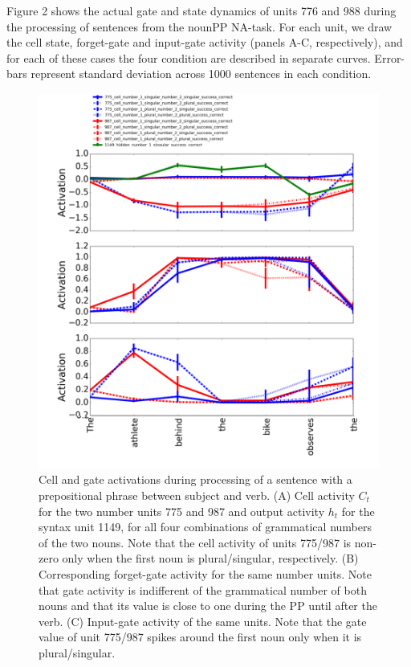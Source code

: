 Figure 2 shows the actual gate and state dynamics of units 776 and 988 during the processing of sentences from the nounPP NA-task. For each unit, we draw the cell state, forget-gate and input-gate activity (panels A-C, respectively), and for each of these cases the four condition are described in separate curves. Error-bars represent standard deviation across 1000 sentences in each condition.

\begin{figure}[h!]
\includegraphics[width=\linewidth]{Figures/Figure2_number_units.png}
\caption{Cell and gate activations during processing of a sentence with a prepositional phrase between subject and verb. (A) Cell activity $C_t$ for the two number units 775 and 987 and output activity $h_t$ for the syntax unit 1149, for all four combinations of grammatical numbers of the two nouns. Note that the cell activity of units 775/987 is non-zero only when the first noun is plural/singular, respectively. (B) Corresponding forget-gate activity for the same number units. Note that gate activity is indifferent of the grammatical number of both nouns and that its value is close to one during the PP until after the verb. (C) Input-gate activity of the same units. Note that the gate value of unit 775/987 spikes around the first noun only when it is plural/singular.}
\end{figure}

